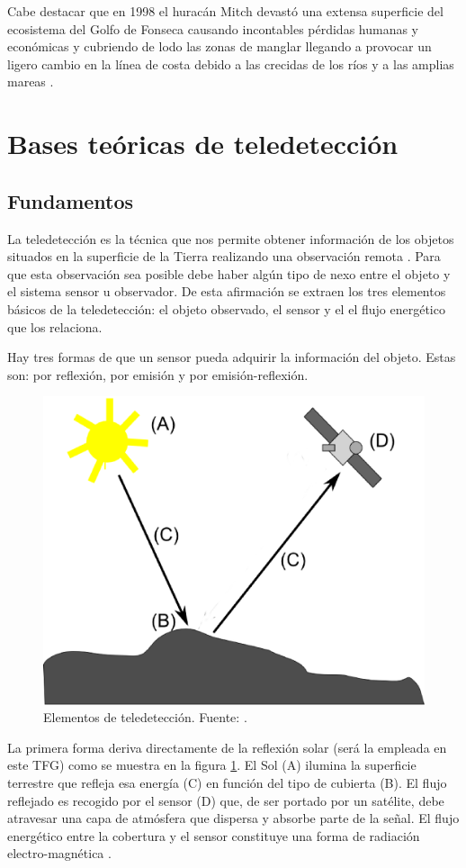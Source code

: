 Cabe destacar que en 1998 el huracán Mitch devastó una extensa superficie del ecosistema del Golfo de Fonseca causando incontables pérdidas humanas y económicas y cubriendo de lodo las zonas de manglar llegando a provocar un ligero cambio en la línea de costa debido a las crecidas de los ríos y a las amplias mareas \citep{mexico1999honduras}.

\section{Bases teóricas de teledetección} \label{sec:bases}
\subsection{Fundamentos} \label{subsec:fundamentos}
La teledetección es la técnica que nos permite obtener información de los objetos situados en la superficie de la Tierra realizando una observación remota \citep{Curran1991Longman,chuvieco2002teledeteccion,schowengerdt2006}. Para que esta observación sea posible debe haber algún tipo de nexo entre el objeto y el sistema sensor u observador. De esta afirmación se extraen los tres elementos básicos de la teledetección: el objeto observado, el sensor y el el flujo energético que los relaciona.%

Hay tres formas de que un sensor pueda adquirir la información del objeto. Estas son: por reflexión, por emisión y por emisión-reflexión.%

\begin{figure}
	\centering
	\includegraphics[width=0.4\linewidth]{./Imagenes/Elementos_teledeteccion_modificado.eps}
	\caption[Elementos de teledetección]{Elementos de teledetección. Fuente: \cite{Olaya2010}.}
	\label{fig:elementos}
\end{figure}

La primera forma deriva directamente de la reflexión solar (será la empleada en este \ac{TFG}) como se muestra en la figura \ref{fig:elementos}. El Sol (A) ilumina la superficie terrestre que refleja esa energía (C) en función del tipo de cubierta (B). El flujo reflejado es recogido por el sensor (D) que, de ser portado por un satélite, debe atravesar una capa de atmósfera que dispersa y absorbe parte de la señal. El flujo energético entre la cobertura y el sensor constituye una forma de radiación electro-magnética \citep{Olaya2010}.%


